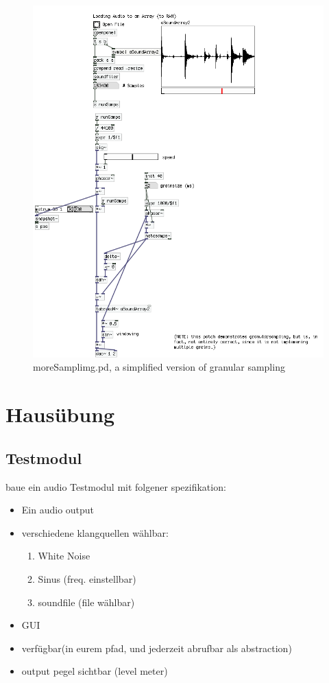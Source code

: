 \begin{figure}[H]
	\begin{center}
		\includegraphics[scale = 0.6]{img/grain.png}
		\caption{moreSamplimg.pd, a simplified version of granular sampling}
		\label{fig:name}
	\end{center}
\end{figure}



\section{Hausübung}
\subsection{Testmodul}

baue ein audio Testmodul mit folgener spezifikation:\\
\begin{itemize}
	\item Ein audio output
	\item verschiedene klangquellen wählbar:
		\begin{enumerate}
			\item White Noise
			\item Sinus (freq. einstellbar)
			\item soundfile (file wählbar)
		\end{enumerate}
	\item GUI
	\item verfügbar(in eurem pfad, und jederzeit abrufbar als abstraction)
	\item output pegel sichtbar (level meter)
\end{itemize}


